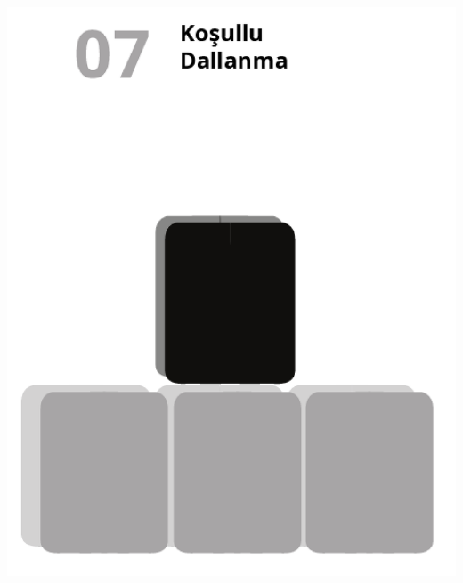 \documentclass[12pt, a4paper]{article}
\begin{document}
\newpage
\includegraphics[width=1\linewidth]{cebir-bolum-07-000.png}
\end{document}
